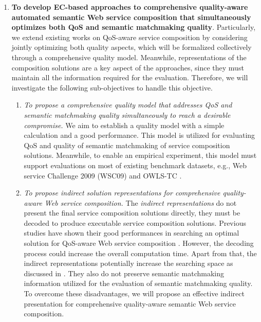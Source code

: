 \begin{enumerate}
  \item \label{Obj:1} \textbf{To develop EC-based approaches to comprehensive quality-aware automated semantic Web service composition that simultaneously optimizes both QoS and semantic matchmaking quality}. Particularly, we extend existing works on QoS-aware service composition by considering jointly optimizing both quality aspects, which will be formalized collectively through a comprehensive quality model. Meanwhile, representations of the composition solutions are a key aspect of the approaches, since they must maintain all the information required for the evaluation. Therefore, we will investigate the following sub-objectives to handle this objective.
  \begin{enumerate}
    \item \emph{To propose a comprehensive quality model that addresses QoS and semantic matchmaking quality simultaneously to reach a desirable compromise.} We aim to establish a quality model with a simple calculation and a good performance. This model is utilized for evaluating QoS and quality of semantic matchmaking of service composition solutions. Meanwhile, to enable an empirical experiment, this model must support evaluations on most of existing benchmark datasets, e.g., Web service Challenge 2009 (WSC09)\cite{kona2009wsc} and OWLS-TC \cite{kuster2008opossum}.
    
    \item \emph{To propose indirect solution representations for comprehensive quality-aware Web service composition.} The \emph{indirect representations} do not present the final service composition solutions directly, they must be decoded to produce executable service composition solutions. Previous studies have shown their good performances in searching an optimal solution for QoS-aware Web service composition \cite{da2016memetic,da2016particle}. However, the decoding process could increase the overall computation time. Apart from that, the indirect representations potentially increase the searching space as discussed in \cite{da2016particle}. They also do not preserve semantic matchmaking information utilized for the evaluation of semantic matchmaking quality. To overcome these disadvantages, we will propose an effective indirect presentation for comprehensive quality-aware semantic Web service composition.


\end{enumerate}
\end{enumerate}
